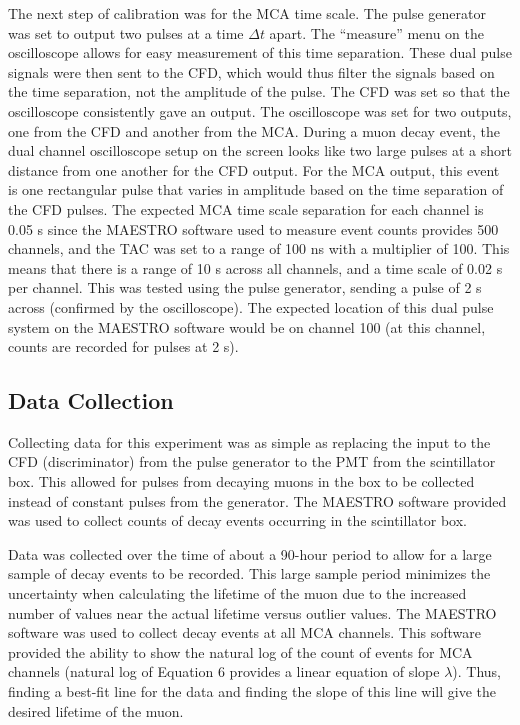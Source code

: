 \documentclass[%
 aip,
 amsmath,amssymb,
 reprint,%
floatfix,
]{revtex4-1}
\begin{document}
The next step of calibration was for the MCA time scale. The pulse generator was set to output two pulses at a time $\Delta t$ apart. The “measure” menu on the oscilloscope allows for easy measurement of this time separation. These dual pulse signals were then sent to the CFD, which would thus filter the signals based on the time separation, not the amplitude of the pulse. The CFD was set so that the oscilloscope consistently gave an output. The oscilloscope was set for two outputs, one from the CFD and another from the MCA. During a muon decay event, the dual channel oscilloscope setup on the screen looks like two large pulses at a short distance from one another for the CFD output. For the MCA output, this event is one rectangular pulse that varies in amplitude based on the time separation of the CFD pulses. The expected MCA time scale separation for each channel is 0.05 \textmu s since the MAESTRO software used to measure event counts provides 500 channels, and the TAC was set to a range of 100 ns with a multiplier of 100. This means that there is a range of 10 \textmu s across all channels, and a time scale of 0.02 \textmu s per channel. This was tested using the pulse generator, sending a pulse of 2 \textmu s across (confirmed by the oscilloscope). The expected location of this dual pulse system on the MAESTRO software would be on channel 100 (at this channel, counts are recorded for pulses at 2 \textmu s).


\subsection{Data Collection}

Collecting data for this experiment was as simple as replacing the input to the CFD (discriminator) from the pulse generator to the PMT from the scintillator box. This allowed for pulses from decaying muons in the box to be collected instead of constant pulses from the generator. The MAESTRO software provided was used to collect counts of decay events occurring in the scintillator box.

Data was collected over the time of about a 90-hour period to allow for a large sample of decay events to be recorded. This large sample period minimizes the uncertainty when calculating the lifetime of the muon due to the increased number of values near the actual lifetime versus outlier values. The MAESTRO software was used to collect decay events at all MCA channels. This software provided the ability to show the natural log of the count of events for MCA channels (natural log of Equation 6 provides a linear equation of slope $\lambda$). Thus, finding a best-fit line for the data and finding the slope of this line will give the desired lifetime of the muon.
\end{document}

